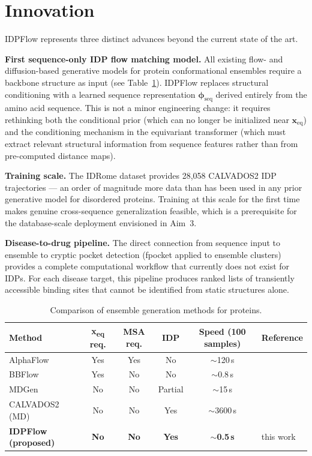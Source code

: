 \documentclass[12pt]{article}
\begin{document}
\section{Innovation}

IDPFlow represents three distinct advances beyond the current state of the art.

\noindent\textbf{First sequence-only IDP flow matching model.}
All existing flow- and diffusion-based generative models for protein conformational ensembles
require a backbone structure as input (see Table~\ref{tab:comparison}).
IDPFlow replaces structural conditioning with a learned sequence representation
$\boldsymbol{\phi}_\mathrm{seq}$ derived entirely from the amino acid sequence.
This is not a minor engineering change: it requires rethinking both the conditional prior
(which can no longer be initialized near $\mathbf{x}_\mathrm{eq}$) and the conditioning
mechanism in the equivariant transformer (which must extract relevant structural information
from sequence features rather than from pre-computed distance maps).

\noindent\textbf{Training scale.}
The IDRome dataset \cite{tesei2024idrome} provides 28,058 CALVADOS2 IDP trajectories --- an
order of magnitude more data than has been used in any prior generative model for disordered
proteins.
Training at this scale for the first time makes genuine cross-sequence generalization
feasible, which is a prerequisite for the database-scale deployment envisioned in Aim~3.

\noindent\textbf{Disease-to-drug pipeline.}
The direct connection from sequence input to ensemble to cryptic pocket detection (fpocket
\cite{le2009fpocket} applied to ensemble clusters) provides a complete computational
workflow that currently does not exist for IDPs.
For each disease target, this pipeline produces ranked lists of transiently accessible
binding sites that cannot be identified from static structures alone.

\begin{table}[h!]
\centering
\caption{Comparison of ensemble generation methods for proteins.}
\label{tab:comparison}
\small
\begin{tabular}{lccccl}
\toprule
Method & \textbf{x\textsubscript{eq} req.} & \textbf{MSA req.} &
\textbf{IDP} & \textbf{Speed (100 samples)} & Reference \\
\midrule
AlphaFlow  & Yes & Yes & No  & $\sim$120\,s   & \cite{jing2024alphaflow}   \\
BBFlow     & Yes & No  & No  & $\sim$0.8\,s   & \cite{wolf2025bbflow}      \\
MDGen      & No  & No  & Partial & $\sim$15\,s  & \cite{arts2023mdgen}       \\
CALVADOS2 (MD) & No & No & Yes & $\sim$3600\,s & \cite{lohr2022calvados2}   \\
\textbf{IDPFlow (proposed)} & \textbf{No} & \textbf{No} & \textbf{Yes} &
    $\sim$\textbf{0.5\,s} & this work \\
\bottomrule
\end{tabular}
\end{table}
\end{document}
